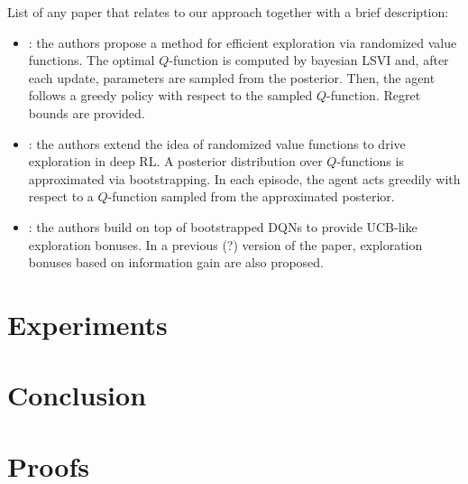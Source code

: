 \documentclass{article}
\begin{document}
List of any paper that relates to our approach together with a brief description:
\begin{itemize}
\item \cite{osband2014generalization}: the authors propose a method for efficient exploration via randomized value functions. The optimal $Q$-function is computed by bayesian LSVI and, after each update, parameters are sampled from the posterior. Then, the agent follows a greedy policy with respect to the sampled $Q$-function. Regret bounds are provided.
\item \cite{osband2016deep}: the authors extend the idea of randomized value functions to drive exploration in deep RL. A posterior distribution over $Q$-functions is approximated via bootstrapping. In each episode, the agent acts greedily with respect to a $Q$-function sampled from the approximated posterior.
\item \cite{chen2017ucb}: the authors build on top of bootstrapped DQNs to provide UCB-like exploration bonuses. In a previous (?) version of the paper, exploration bonuses based on information gain are also proposed.
\end{itemize}

\section{Experiments}

\section{Conclusion}

{\small 


}
\newpage
\appendix

\section{Proofs}
\end{document}
